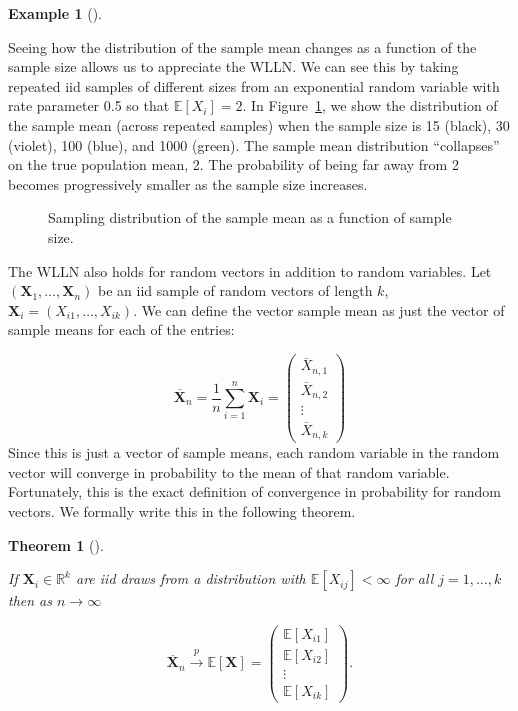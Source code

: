 \documentclass[
  13pt,
  letterpaper,
  DIV=11,
  numbers=noendperiod]{scrreprt}
\newcommand{\mb}{\symbf}
\newcommand{\E}{\mathbb{E}}
\newcommand{\Xbar}{\overline{X}}
\newcommand{\X}{\mb{X}}
\newcommand{\inprob}{\overset{p}{\to}}
\theoremstyle{plain}
\newtheorem{theorem}{Theorem}[chapter]
\theoremstyle{definition}
\newtheorem{example}{Example}[chapter]
\theoremstyle{definition}
\theoremstyle{remark}
\begin{document}
\begin{example}[]\protect\hypertarget{exm-lln}{}\label{exm-lln}

Seeing how the distribution of the sample mean changes as a function of
the sample size allows us to appreciate the WLLN. We can see this by
taking repeated iid samples of different sizes from an exponential
random variable with rate parameter 0.5 so that \(\E[X_i] = 2\). In
Figure~\ref{fig-lln-sim}, we show the distribution of the sample mean
(across repeated samples) when the sample size is 15 (black), 30
(violet), 100 (blue), and 1000 (green). The sample mean distribution
``collapses'' on the true population mean, 2. The probability of being
far away from 2 becomes progressively smaller as the sample size
increases.

\begin{figure}[th]


\caption{\label{fig-lln-sim}Sampling distribution of the sample mean as
a function of sample size.}

\end{figure}%

\end{example}

The WLLN also holds for random vectors in addition to random variables.
Let \((\X_1, \ldots, \X_n)\) be an iid sample of random vectors of
length \(k\), \(\mb{X}_i = (X_{i1}, \ldots, X_{ik})\). We can define the
vector sample mean as just the vector of sample means for each of the
entries:

\[
\overline{\mb{X}}_n = \frac{1}{n} \sum_{i=1}^n \mb{X}_i =
\begin{pmatrix}
\Xbar_{n,1} \\ \Xbar_{n,2} \\ \vdots \\ \Xbar_{n, k}
\end{pmatrix}
\] Since this is just a vector of sample means, each random variable in
the random vector will converge in probability to the mean of that
random variable. Fortunately, this is the exact definition of
convergence in probability for random vectors. We formally write this in
the following theorem.

\begin{theorem}[]\protect\hypertarget{thm-vector-wlln}{}\label{thm-vector-wlln}

If \(\X_i \in \mathbb{R}^k\) are iid draws from a distribution with
\(\E[X_{ij}] < \infty\) for all \(j=1,\ldots,k\) then as
\(n\rightarrow\infty\)

\[
\overline{\mb{X}}_n \inprob \E[\X] =
\begin{pmatrix}
\E[X_{i1}] \\ \E[X_{i2}] \\ \vdots \\ \E[X_{ik}]
\end{pmatrix}.
\]

\end{theorem}
\end{document}
